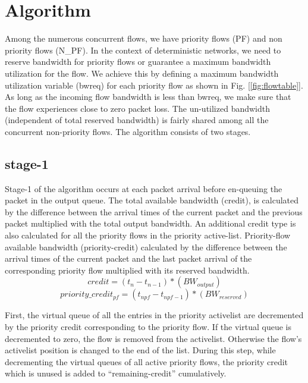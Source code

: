 \documentclass[conference]{IEEEtran}
\begin{document}
\section{Algorithm}

Among the numerous concurrent flows, we have priority flows (PF) and non priority flows (N\_PF). In the context of deterministic networks, we need to reserve bandwidth for priority flows or guarantee a maximum bandwidth utilization for the flow. We achieve this by defining a maximum bandwidth utilization variable (bwreq) for each priority flow as shown in Fig. [\ref{fig:flowtable}]. As long as the incoming flow bandwidth is less than bwreq, we make sure that the flow experiences close to zero packet loss. The un-utilized bandwidth (independent of total reserved bandwidth) is fairly shared among all the concurrent non-priority flows. The algorithm consists of two stages.

\subsection {stage-1}
Stage-1 of the algorithm occurs at each packet arrival before en-queuing the packet in the output queue. The total available bandwidth (credit), is calculated by the difference between the arrival times of the current packet and the previous packet multiplied with the total output bandwidth. An additional credit type is also calculated for all the priority flows in the priority active-list. Priority-flow available bandwidth (priority-credit) calculated by the difference between the arrival times of the current packet and the last packet arrival of the corresponding priority flow multiplied with its reserved bandwidth. 
\begin{equation}
credit=(t_n - t_{n-1})*(BW_{output})\label{credit}
\end{equation}
\begin{equation}
priority\_credit_{pf}=(t_{npf}-t_{npf-1})*(BW_{reserved})\label{prioritycredit}
\end{equation}

First, the virtual queue of all the entries in the priority activelist are decremented by the priority credit corresponding to the priority flow. If the virtual queue is decremented to zero, the flow is removed from the activelist. Otherwise the flow's activelist position is changed to the end of the list. During this step, while decrementing the virtual queues of all active priority flows, the priority credit which is unused is added to ``remaining-credit'' cumulatively.
\end{document}
